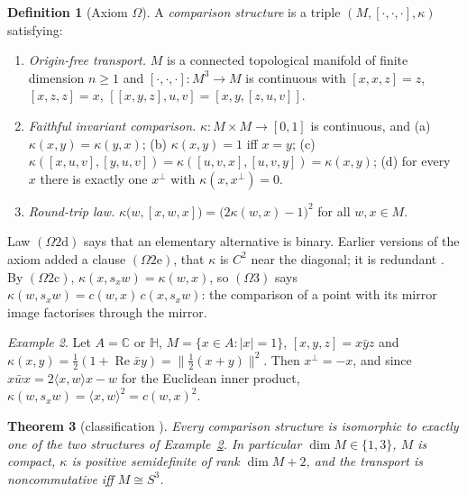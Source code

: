 \documentclass[aps,pra,onecolumn,superscriptaddress,nofootinbib,10pt]{revtex4-2}
\newtheorem{theorem}{Theorem}
\theoremstyle{definition}
\newtheorem{definition}[theorem]{Definition}
\theoremstyle{remark}
\newtheorem{example}[theorem]{Example}
\newcommand{\C}{\mathbb{C}}
\newcommand{\HH}{\mathbb{H}}
\newcommand{\re}{\operatorname{Re}}
\newcommand{\ip}[2]{\langle #1,#2\rangle}
\newcommand{\hp}[3]{[#1,#2,#3]}
\begin{document}
\begin{definition}[Axiom $\Omega$]\label{def:cs}
A \emph{comparison structure} is a triple $(M,\hp{\cdot}{\cdot}{\cdot},\kappa)$ satisfying:
\begin{enumerate}[label=$(\Omega\arabic*)$,leftmargin=3.2em]
\item \emph{Origin-free transport.}  $M$ is a connected topological manifold of finite dimension
$n\ge1$ and $\hp{\cdot}{\cdot}{\cdot}\colon M^3\to M$ is continuous with
$\hp{x}{x}{z}=z$, $\hp{x}{z}{z}=x$, $\hp{\hp{x}{y}{z}}{u}{v}=\hp{x}{y}{\hp{z}{u}{v}}$.
\item \emph{Faithful invariant comparison.}  $\kappa\colon M\times M\to[0,1]$ is continuous, and
(a) $\kappa(x,y)=\kappa(y,x)$; (b) $\kappa(x,y)=1$ iff $x=y$;
(c) $\kappa(\hp{x}{u}{v},\hp{y}{u}{v})=\kappa(\hp{u}{v}{x},\hp{u}{v}{y})=\kappa(x,y)$;
(d) for every $x$ there is exactly one $x^\perp$ with $\kappa(x,x^\perp)=0$.
\item \emph{Round-trip law.}  $\kappa\bigl(w,\hp{x}{w}{x}\bigr)=\bigl(2\kappa(w,x)-1\bigr)^2$ for all
$w,x\in M$.
\end{enumerate}
\end{definition}
Law $(\Omega2\mathrm d)$ says that an elementary alternative is binary.  Earlier versions of the axiom
added a clause $(\Omega2\mathrm e)$, that $\kappa$ is $C^2$ near the diagonal; it is redundant
\cite[Thm.~3.11]{PaperI}.  By $(\Omega2\mathrm c)$,
$\kappa(x,s_xw)=\kappa(w,x)$, so $(\Omega3)$ says $\kappa(w,s_xw)=c(w,x)\,c(x,s_xw)$: the comparison of
a point with its mirror image factorises through the mirror.

\begin{example}\label{ex:models}
Let $A=\C$ or $\HH$, $M=\{x\in A:\lvert x\rvert=1\}$, $\hp{x}{y}{z}=x\bar yz$ and
$\kappa(x,y)=\tfrac12(1+\re\bar xy)=\lVert\tfrac12(x+y)\rVert^2$.  Then $x^\perp=-x$, and since
$x\bar wx=2\ip{x}{w}x-w$ for the Euclidean inner product, $\kappa(w,s_xw)=\ip{x}{w}^2=c(w,x)^2$.
\end{example}

\begin{theorem}[classification {\cite[Thms.~3.1, 3.11]{PaperI}}]\label{thm:main}
Every comparison structure is isomorphic to exactly one of the two structures of
Example~\ref{ex:models}.  In particular $\dim M\in\{1,3\}$, $M$ is compact, $\kappa$ is positive
semidefinite of rank $\dim M+2$, and the transport is noncommutative iff $M\cong S^3$.
\end{theorem}
\end{document}
